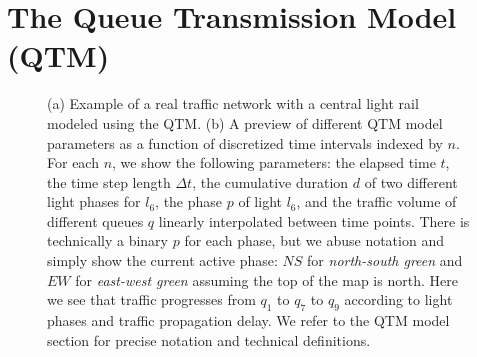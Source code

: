 \section{The Queue Transmission Model (QTM)}


\begin{figure}[t]
\centering
\caption{(a) Example of a real traffic network with a central light rail modeled
  using the
  QTM. (b) 
  A preview of different QTM model parameters as a function
  of discretized time intervals indexed by $n$.
  For each $n$, we show the following parameters: the elapsed time
  $t$, the time step length $\Delta t$, the cumulative
  duration $d$ of two different light phases for $l_6$, the phase $p$
  of light $l_6$, and the traffic volume of different queues $q$
  linearly interpolated between time points.  There is technically a
  binary $p$ for each phase, but we abuse notation and simply
  show the current active phase: $\mathit{NS}$ for \emph{north-south green} and 
  $\mathit{EW}$ for \emph{east-west green} assuming the top of the map is north.
  Here we see that traffic progresses from $q_1$ to $q_7$ to $q_9$
  according to light phases and traffic propagation delay.
  We refer to the QTM model section for
  precise notation and technical definitions.}
\label{fig:qtm}
%
\end{figure}



